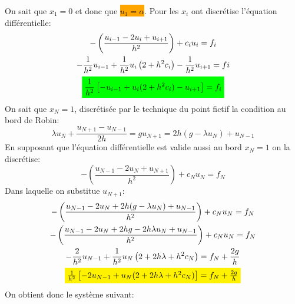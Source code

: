 On sait que $x_1=0$ et donc que \colorbox{orange}{$u_1=\alpha$}. Pour les $x_i$ ont discrétise l'équation
différentielle:
\begin{gather*}
    -\left(\frac{u_{i-1}-2u_i+u_{i+1}}{h^2}\right)+c_iu_i=f_i\\
    -\frac{1}{h^2}u_{i-1}+\frac{1}{h^2}u_i\left(2+h^2c_i\right)-\frac{1}{h^2}u_{i+1}=fi\\
    \colorbox{green}{$\displaystyle\frac{1}{h^2}\left[-u_{i-1}+u_i(2+h^2c_i)-u_{i+1}\right]=f_i$}
\end{gather*}
On sait que $x_N=1$, discrétisée par le technique du point fictif la condition au bord de Robin:
\begin{subequations}
    \begin{equation*}
        \lambda u_N+\frac{u_{N+1}-u_{N-1}}{2h}=g
    \end{equation*}
    \begin{equation*}
        u_{N+1}=2h(g-\lambda u_N)+u_{N-1}
    \end{equation*}
\end{subequations}
En supposant que l'équation différentielle est valide aussi au bord $x_N=1$ on la discrétise:
\begin{equation*}
    -\left(\frac{u_{N-1}-2u_N+u_{N+1}}{h^2}\right)+c_Nu_N=f_N
\end{equation*}
Dans laquelle on substitue $u_{N+1}$:
\begin{gather*}
    -\left(\frac{u_{N-1}-2u_N+2h(g-\lambda u_N)+u_{N-1}}{h^2}\right)+c_Nu_N  =f_N              \\
    -\left(\frac{u_{N-1}-2u_N+2hg-2h\lambda u_N+u_{N-1}}{h^2}\right)+c_Nu_N  =f_N              \\
    -\frac{2}{h^2}u_{N-1}+\frac{1}{h^2}u_N\left(2+2h\lambda+h^2c_N\right)    =f_N+\frac{2g}{h} \\
    \colorbox{yellow}{$\frac{1}{h^2}\left[-2u_{N-1}+u_N(2+2h\lambda+h^2c_N)\right]              =f_N+\frac{2g}{h}$}
\end{gather*}
On obtient donc le système suivant:
